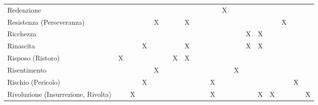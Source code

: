 \documentclass[10pt,a3paper]{memoir}
\begin{document}
\begin{table}[h]
\begin{tabular}{l|c|c|c|c|c|c|c|c|c|c|c|c|c|c|c|c|c|c}
Redenzione &  &  &  &  &  &  &  &  &  &  & X &  &  &  &  &  &  &  \\
Resistenza (Perseveranza) &  &  &  & X &  &  & X &  &  &  &  &  &  &  &  & X &  &  \\
Ricchezza &  &  &  &  &  &  &  &  &  &  &  &  & X & X &  &  &  &  \\
Rinascita &  &  & X &  &  &  & X &  &  &  &  &  & X & X &  &  &  &  \\
Risposo (Ristoro) & X &  &  &  &  & X & X &  &  &  &  &  &  &  &  &  &  &  \\
Risentimento &  &  &  & X &  &  &  &  &  &  &  & X &  &  &  &  &  &  \\
Rischio (Pericolo) &  &  & X &  &  &  &  &  &  & X &  &  &  &  &  &  & X &  \\
Rivoluzione (Insurrezione, Rivolta) &  & X &  &  &  &  &  &  &  & X &  &  &  & X & X &  &  & X \\
\bottomrule
\end{tabular}
\end{table}
\end{document}
